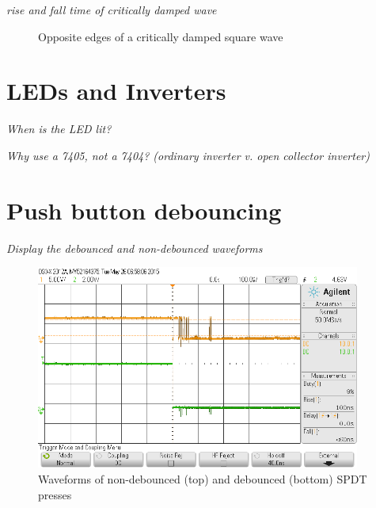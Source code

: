 \documentclass[11pt]{article}
\begin{document}
{\em rise and fall time of critically damped wave}
\begin{figure}
	\centering
	\caption{Opposite edges of a critically damped square wave}
	\label{fig:rise_fall}
\end{figure}

\section{LEDs and Inverters}
{\em When is the LED lit?}

{\em Why use a 7405, not a 7404? (ordinary inverter v. open collector inverter)}

\section{Push button debouncing}
{\em Display the debounced and non-debounced waveforms}
\begin{figure}[h]
	\centering
	\includegraphics[width=0.95\textwidth, draft=false]{debounce}
	\caption{Waveforms of non-debounced (top) and debounced (bottom) SPDT presses}
	\label{fig:debounce}
\end{figure}
\end{document}
